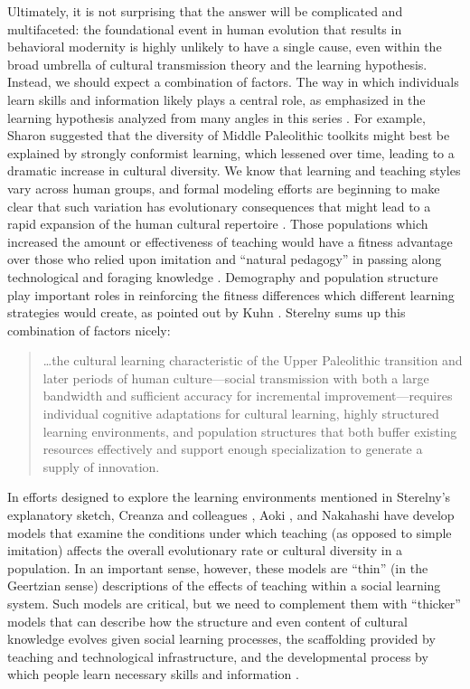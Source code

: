 \documentclass[graybox,natbib]{svmult}
\begin{document}
Ultimately, it is not surprising that the answer will be complicated and
multifaceted: the foundational event in human evolution that results in
behavioral modernity is highly unlikely to have a single cause, even
within the broad umbrella of cultural transmission theory and the
learning hypothesis. Instead, we should expect a combination of factors.
The way in which individuals learn skills and information likely plays a
central role, as emphasized in the learning hypothesis analyzed from
many angles in this series
\citep{Aoki2013Determinants-of, Nishiaki2013Introduction}. For example,
Sharon \citeyearpar{sharon2009acheulian} suggested that the diversity of
Middle Paleolithic toolkits might best be explained by strongly
conformist learning, which lessened over time, leading to a dramatic
increase in cultural diversity. We know that learning and teaching
styles vary across human groups, and formal modeling efforts are
beginning to make clear that such variation has evolutionary
consequences that might lead to a rapid expansion of the human cultural
repertoire \citep{Nakahashi2013Cultural-Evolut}. Those populations which
increased the amount or effectiveness of teaching would have a fitness
advantage over those who relied upon imitation and ``natural pedagogy''
in passing along technological and foraging knowledge
\citep{Csibra:2011dx, Fogarty:2011gv, Terashima2013The-Evolutionar}.
Demography and population structure play important roles in reinforcing
the fitness differences which different learning strategies would
create, as pointed out by Kuhn \citeyearpar{Kuhn2013Cultural-Transm}.
Sterelny \citeyearpar[p.61]{sterelny2012evolved} sums up this
combination of factors nicely:

\begin{quote}
\ldots{}the cultural learning characteristic of the Upper Paleolithic
transition and later periods of human culture---social transmission with
both a large bandwidth and sufficient accuracy for incremental
improvement---requires individual cognitive adaptations for cultural
learning, highly structured learning environments, and population
structures that both buffer existing resources effectively and support
enough specialization to generate a supply of innovation.
\end{quote}

In efforts designed to explore the learning environments mentioned in
Sterelny's explanatory sketch, Creanza and colleagues
\citeyearpar{Creanza2013Exploring-Cultu}, Aoki
\citeyearpar{Aoki2013Determinants-of}, and Nakahashi
\citeyearpar{Nakahashi2013Cultural-Evolut} have develop models that
examine the conditions under which teaching (as opposed to simple
imitation) affects the overall evolutionary rate or cultural diversity
in a population. In an important sense, however, these models are
``thin'' (in the Geertzian sense) descriptions of the effects of
teaching within a social learning system. Such models are critical, but
we need to complement them with ``thicker'' models that can describe how
the structure and even content of cultural knowledge evolves given
social learning processes, the scaffolding provided by teaching and
technological infrastructure, and the developmental process by which
people learn necessary skills and information \citep{wimsatt2014}.
\end{document}
